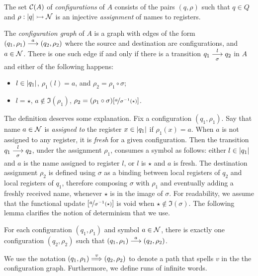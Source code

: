 \begin{definition}\label{def:configuration}
 The set $\mathcal{C}(A)$ of \emph{configurations} of $A$ consists of the pairs $(q,\rho)$ such that $q \in Q$ and $\rho : |q| \rightarrowtail \mathcal{N}$ is an injective \emph{assignment} of names to registers.
\end{definition}

\begin{definition}
\label{def:configuration-graph}
The \emph{configuration graph} of $A$ is a graph with edges of the form  
$(q_1,\rho_1) \overset{a}{\longrightarrow} (q_2,\rho_2)$ where the source and destination are configurations, and $a \in \mathcal{N}$. There is one such edge if and only if there is a transition $q_1 \overset{l}{\underset{\sigma}{\longrightarrow}} q_2$ in $A$ and either of the following happens: 
 \begin{itemize} 
  \item $l \in |q_1|$, $\rho_1(l) = a$, and $\rho_2 = \rho_1 \circ \sigma$;
  \item $l = \star$, $a \notin \Im(\rho_1)$, $\rho_2 = (\rho_1 \circ \sigma)[\nicefrac{a}{\sigma^{-1}(\star)}]$.
 \end{itemize}
\end{definition}
% 

The definition deserves some explanation. Fix a configuration $(q_1,\rho_1)$. Say that name $a\in \mathcal{N}$ is \emph{assigned to} the register $x \in |q_1|$ if $\rho_1(x) = a$. When $a$ is not assigned to any register, it is \emph{fresh} for a given configuration. Then the transition $q_1 \overset{l}{\underset{\sigma}{\longrightarrow}} q_2$, under the assignment $\rho_1$, consumes a symbol as follows: either $l \in |q_1|$ and $a$ is the name assigned to register $l$, or $l$ is $\star$ and $a$ is fresh. The destination assignment $\rho_2$ is defined using $\sigma$ as a binding between local registers of $q_2$ and local registers of $q_1$, therefore composing $\sigma$ with $\rho_1$ and eventually adding a freshly received name, whenever $\star$ is in the image of $\sigma$. For readability, we assume that the functional update $[\nicefrac{a}{\sigma^{-1}(\star)}]$ is void when $\star \notin \Im(\sigma)$. The following lemma clarifies the notion of determinism that we use.

\begin{lemma}
\label{lem:deterministic-configuration-graph}
 For each configuration $(q_1,\rho_1)$ and symbol $a \in \mathcal{N}$, there is exactly one configuration $(q_2,\rho_2)$ such that $(q_1,\rho_1) \overset{a}{\longrightarrow} (q_2,\rho_2)$.
\end{lemma}
%
We use the notation $(q_1,\rho_1) \overset{v}{\Longrightarrow} (q_2,\rho_2)$ to denote a path that spells $v$ in the the configuration graph. Furthermore, we define runs of infinite words.
%

